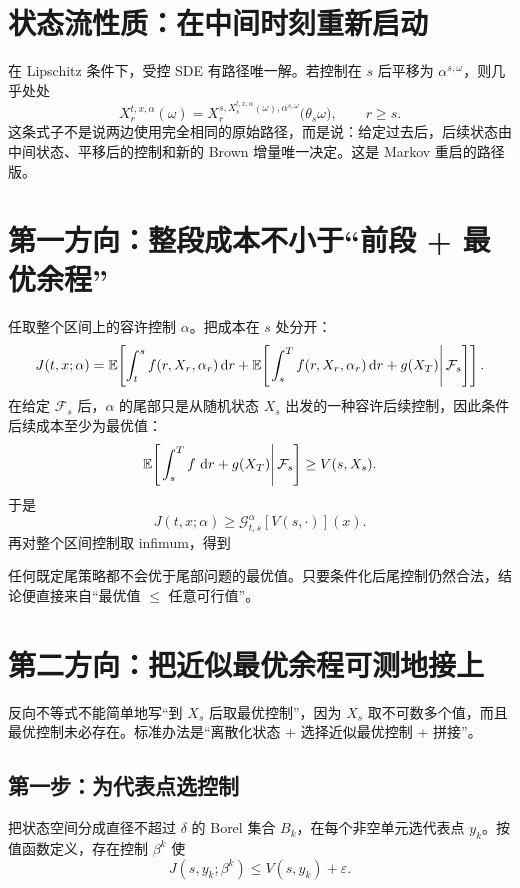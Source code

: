 \section{状态流性质：在中间时刻重新启动}

在 Lipschitz 条件下，受控 SDE 有路径唯一解。若控制在 $s$ 后平移为 $\alpha^{s,\omega}$，则几乎处处
\[
X_r^{t,x,\alpha}(\omega)
=X_r^{s,X_s^{t,x,\alpha}(\omega),\alpha^{s,\omega}}
\bigl(\theta_s\omega\bigr),
\qquad r\ge s.
\]
这条式子不是说两边使用完全相同的原始路径，而是说：给定过去后，后续状态由中间状态、平移后的控制和新的 Brown 增量唯一决定。这是 Markov 重启的路径版。

\section{第一方向：整段成本不小于“前段 + 最优余程”}

任取整个区间上的容许控制 $\alpha$。把成本在 $s$ 处分开：
\[
J(t,x;\alpha)
=\mathbb{E}\!\left[
\int_t^s f(r,X_r,\alpha_r)\,\mathrm{d} r
+\mathbb{E}\!\left[
\left.
\int_s^T f(r,X_r,\alpha_r)\,\mathrm{d} r+g(X_T)
\right|\mathcal F_s
\right]\right].
\]
在给定 $\mathcal F_s$ 后，$\alpha$ 的尾部只是从随机状态 $X_s$ 出发的一种容许后续控制，因此条件后续成本至少为最优值：
\[
\mathbb{E}\!\left[
\left.
\int_s^T f\,\,\mathrm{d} r+g(X_T)
\right|\mathcal F_s
\right]\ge V(s,X_s).
\]
于是
\[
J(t,x;\alpha)
\ge\mathcal G_{t,s}^{\alpha}[V(s,\cdot)](x).
\]
再对整个区间控制取 infimum，得到

\begin{intuition}[这一方向为什么相对容易]
任何既定尾策略都不会优于尾部问题的最优值。只要条件化后尾控制仍然合法，结论便直接来自“最优值 $\le$ 任意可行值”。
\end{intuition}

\section{第二方向：把近似最优余程可测地接上}

反向不等式不能简单地写“到 $X_s$ 后取最优控制”，因为 $X_s$ 取不可数多个值，而且最优控制未必存在。标准办法是“离散化状态 + 选择近似最优控制 + 拼接”。

\subsection{第一步：为代表点选控制}

把状态空间分成直径不超过 $\delta$ 的 Borel 集合 $B_k$，在每个非空单元选代表点 $y_k$。按值函数定义，存在控制 $\beta^k$ 使
\[
J(s,y_k;\beta^k)\le V(s,y_k)+\varepsilon.
\]

